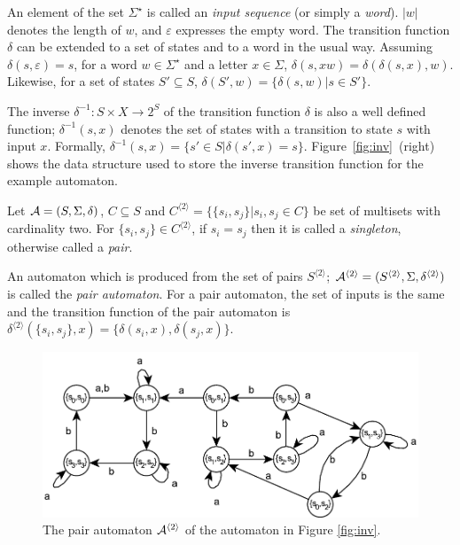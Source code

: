 \pagebreak

An element of the set $\Sigma^\star$ is called an {\em input sequence} (or simply a {\em word}). $|w|$ denotes the length of $w$, and $\varepsilon$ expresses the empty word. The transition function $\delta$ can be extended to a set of states and to a word in the usual way. Assuming $\delta(s,\varepsilon)=s$, for a word $w \in \Sigma^\star$ and a letter $x \in \Sigma$, $\delta(s,xw) = \delta(\delta(s,x),w)$. Likewise, for a set of states $S' \subseteq S$, $\delta(S',w) = \{ \delta(s,w) | s \in S'\}$.

The inverse $\delta^{-1} : S \times X \rightarrow 2^S$ of the transition function $\delta$ is also a well defined function; $\delta^{-1}(s,x)$ denotes the set of states with a transition to state $s$ with input $x$. Formally, $\delta^{-1}(s,x) = \{ s' \in S | \delta(s',x)= s\}$.  Figure~\ref{fig:inv}~(right) shows the data structure used to store the inverse transition function for the example automaton.

Let ${\cal A}=(S, \Sigma, \delta)$, $C \subseteq S$ and $C^{\langle 2 \rangle} = \{ \{ s_i, s_j \}| s_i,s_j \in C \}$ be set of multisets  with cardinality two. For $\{ s_i, s_j \} \in C^{\langle 2 \rangle}$, if $s_i=s_j$ then it is called a \textit{singleton}, otherwise called a \textit{pair}. 

An automaton which is produced from the set of pairs $S^{\langle 2 \rangle}$; ${\cal A}^{\langle 2 \rangle}=(S^{\langle 2 \rangle},\Sigma,\delta^{\langle 2 \rangle})$ is called the \textit{pair automaton}. For a pair automaton, the set of inputs is the same and the transition function of the pair automaton is $\delta^{\langle 2 \rangle}(\{ s_i,s_j \},x) = \{ \delta(s_i,x), \delta(s_j,x) \}$. 

\begin{figure}[ht]
	\centering
	\includegraphics[width=\textwidth]{figs/pair.pdf}
	\caption{The pair automaton ${\cal A}^{\langle 2 \rangle}$ of the automaton in Figure \ref{fig:inv}.}
	\label{fig:pair}
\end{figure}

